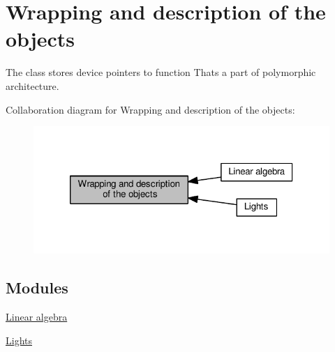 \hypertarget{group__wrapping__and__description}{}\section{Wrapping and description of the objects}
\label{group__wrapping__and__description}


The class stores device pointers to function That\textquotesingle{}s a part of polymorphic architecture.  


Collaboration diagram for Wrapping and description of the objects\+:
\nopagebreak
\begin{figure}[H]
\begin{center}
\leavevmode
\includegraphics[width=320pt]{group__wrapping__and__description}
\end{center}
\end{figure}
\subsection*{Modules}
\begin{DoxyCompactItemize}
\item 
\hyperlink{group__linear__algebra}{Linear algebra}
\item 
\hyperlink{group__lights}{Lights}
\end{DoxyCompactItemize}
